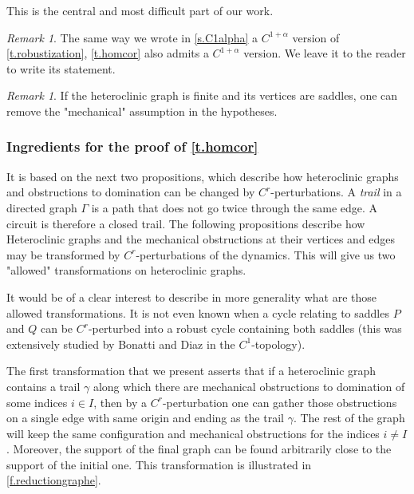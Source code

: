 \documentclass[11pt, a4paper]{amsart}
\theoremstyle{plain}
\theoremstyle{definition}
\theoremstyle{remark}
\newtheorem{remark}[proposition]{Remark}
\numberwithin{equation}{section}         %
\begin{document}
This is the central and most difficult part of our work. 

\begin{remark} The same way we wrote in \cref{s.C1alpha} a $C^{1+\alpha}$ version of \cref{t.robustization}, \cref{t.homcor} also admits a $C^{1+\alpha}$ version. We leave it to the reader to write its statement.
\end{remark}

\begin{remark} If the heteroclinic graph is finite and its vertices are saddles, one can remove the "mechanical" assumption in the hypotheses.
\end{remark} 



\subsubsection{Ingredients for the proof of \cref{t.homcor}}
It is based on the next two propositions, which describe how heteroclinic graphs and obstructions to domination can be changed by $C^r$-perturbations.
A {\em trail} in a directed graph $\Gamma$ is a path that does not go twice through the same edge. A circuit is therefore a closed trail. The following propositions describe how Heteroclinic graphs and the mechanical obstructions at their vertices and edges may be transformed by $C^r$-perturbations of the dynamics. This will give us two "allowed" transformations on heteroclinic graphs. 

It would be of a clear interest to describe in more generality what are those allowed transformations. It is not even known when a cycle relating to saddles $P$ and $Q$ can be $C^r$-perturbed into a robust cycle containing both saddles (this was extensively studied by Bonatti and Diaz in the $C^1$-topology).

The first transformation that we present asserts that if a heteroclinic graph contains a trail $\gamma$ along which there are mechanical obstructions to domination of some indices $i\in I$, then by a $C^r$-perturbation one can gather those obstructions on a single edge with same origin and ending as the trail $\gamma$. 
The rest of the graph will keep the same configuration and mechanical obstructions for the indices $i\neq I$. Moreover, the support of the final graph can be found arbitrarily close to the support of the initial one. This transformation is illustrated in \cref{f.reductiongraphe}.
\end{document}
